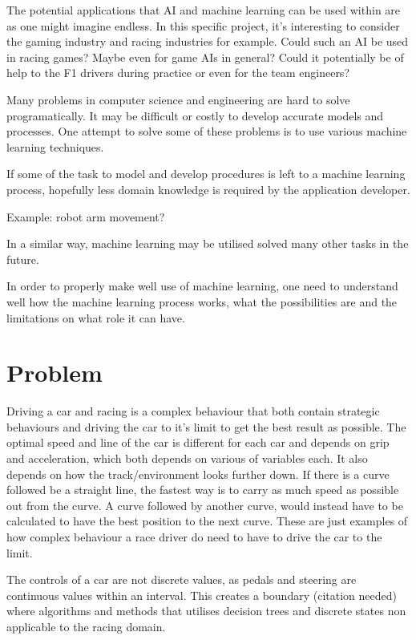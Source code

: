 The potential applications that AI and machine learning can be used within are as one might imagine endless. In this specific project, it's interesting to consider the gaming industry and racing industries for example. Could such an AI be used in racing games? Maybe even for game AIs in general? Could it potentially be of help to the F1 drivers during practice or even for the team engineers? 



Many problems in computer science and engineering are hard to solve programatically. It may be difficult or costly to develop accurate models and processes. One attempt to solve some of these problems is to use various machine learning techniques. 

If some of the task to model and develop procedures is left to a machine learning process, hopefully less domain knowledge is required by the application developer. 

Example: robot arm movement?

In a similar way, machine learning may be utilised solved many other tasks in the future.

In order to properly make well use of machine learning, one need to understand well how the machine learning process works, what the possibilities are and the limitations on what role it can have.
\fi



\section{Problem}
Driving a car and racing is a complex behaviour that both contain strategic behaviours and driving the car to it's limit to get the best result as possible. The optimal speed and line of the car is different for each car and depends on grip and acceleration, which both depends on various of variables each. It also depends on how the track/environment looks further down. If there is a curve followed be a straight line, the fastest way is to carry as much speed as possible out from the curve. A curve followed by another curve, would instead have to be calculated to have the best position to the next curve. These are just examples of how complex behaviour a race driver do need to have to drive the car to the limit.

The controls of a car are not discrete values, as pedals and steering are continuous values within an interval. This creates a boundary (citation needed) where algorithms and methods that utilises decision trees and discrete states non applicable to the racing domain. 

